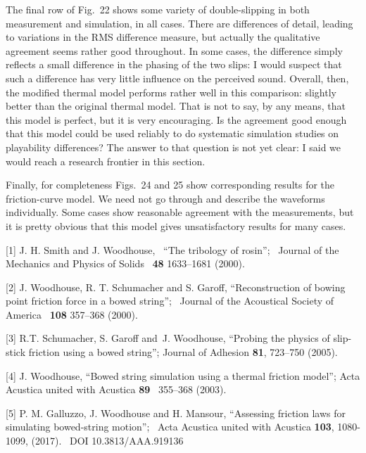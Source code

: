   The final row of Fig.\ 22 shows some variety of double-slipping in both 
  measurement and simulation, in all cases. There are differences of detail, 
  leading to variations in the RMS difference measure, but actually the 
  qualitative agreement seems rather good throughout. In some cases, the 
  difference simply reflects a small difference in the phasing of the two 
  slips: I would suspect that such a difference has very little influence on 
  the perceived sound. Overall, then, the modified thermal model performs 
  rather well in this comparison: slightly better than the original thermal 
  model. That is not to say, by any means, that this model is perfect, but it 
  is very encouraging. Is the agreement good enough that this model could be 
  used reliably to do systematic simulation studies on playability differences? 
  The answer to that question is not yet clear: I said we would reach a 
  research frontier in this section. 

  Finally, for completeness Figs.\ 24 and 25 show corresponding results for the 
  friction-curve model. We need not go through and describe the waveforms 
  individually. Some cases show reasonable agreement with the measurements, but 
  it is pretty obvious that this model gives unsatisfactory results for many 
  cases. 



  \sectionreferences{}[1] J. H. Smith and J. Woodhouse,~ “The tribology of 
  rosin”;~ Journal of the Mechanics and Physics of Solids~ \textbf{48} 
  1633–1681 (2000). 

  [2] J. Woodhouse, R. T. Schumacher and S. Garoff, “Reconstruction of bowing 
  point friction force in a bowed string”;~ Journal of the Acoustical Society 
  of America~ \textbf{108} 357–368 (2000). 

  [3] R.T. Schumacher, S. Garoff and~J. Woodhouse, “Probing the physics of 
  slip-stick friction using a bowed string”; Journal of Adhesion \textbf{81}, 
  723–750 (2005). 

  [4] J. Woodhouse, “Bowed string simulation using a thermal friction model”; 
  Acta Acustica united with Acustica \textbf{89}~ 355–368 (2003). 

  [5] P. M. Galluzzo, J. Woodhouse and H. Mansour, “Assessing friction laws for 
  simulating bowed-string motion”;~ Acta Acustica united with Acustica 
  \textbf{103}, 1080-1099, (2017).~ DOI 10.3813/AAA.919136 